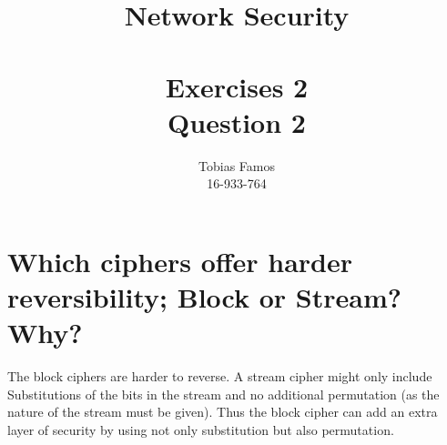\documentclass[11pt,a4paper]{article}
\title{Network Security \\ ~\\ \Large{Exercises 2 \\Question 2}}
\author{Tobias Famos\\ 16-933-764}
\begin{document}
    \maketitle
    \section{Which ciphers offer harder reversibility; Block or Stream? Why?}
    The block ciphers are harder to reverse.
    A stream cipher might only include Substitutions of the bits in the stream and no additional permutation (as the nature of the stream must be given).
    Thus the block cipher can add an extra layer of security by using not only substitution but also permutation.
\end{document}
